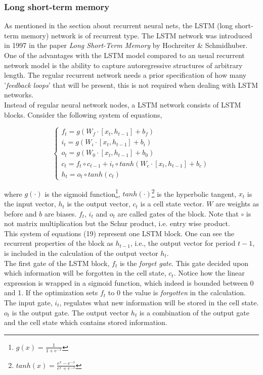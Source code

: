 \documentclass[12pt, letterpaper]{amsart}%
\begin{document}
\subsubsection{Long short-term memory}
As mentioned in the section about recurrent neural nets, the LSTM (long short-term memory) network is of recurrent type. The LSTM network was introduced in 1997 in the paper \textit{Long Short-Term Memory} by Hochreiter \& Schmidhuber. One of the advantages with the LSTM model compared to an usual recurrent network model is the ability to capture autoregressive structures of arbitrary length. The regular recurrent network needs a prior specification of how many '\textit{feedback loops}' that will be present, this is not required when dealing with LSTM networks.
\\

Instead of regular neural network nodes, a LSTM network consists of LSTM blocks. Consider the following system of equations,

\begin{equation}
\begin{cases}
f_t = g \left( W_f \cdot [x_t, h_{t-1}] + b_f \right)\\
i_t = g \left( W_i \cdot [x_t, h_{t-1}] + b_i \right)\\
o_t = g \left( W_0 \cdot [x_t, h_{t-1}] + b_0 \right)\\
c_t = f_t \circ c_{t-1} + i_t \circ tanh \left( W_c \cdot [x_t, h_{t-1}] + b_c \right)\\
h_t = o_t \circ tanh \left( c_t \right)
\end{cases}
\end{equation}

where $g(\cdot)$ is the sigmoid function\footnote{$g(x)=\frac{1}{1+e^{-x}}$}, $tanh(\cdot)$\footnote{$tanh(x)= \frac{e^x - e^{-x}}{e^x + e^{-x}}$} is the hyperbolic tangent, $x_t$ is the input vector, $h_t$ is the output vector, $c_t$ is a cell state vector. $W$ are weights as before and $b$ are biases. $f_t$, $i_t$ and $o_t$ are called gates of the block. Note that $\circ$ is not matrix multiplication but the Schur product, i.e. entry wise product.
\\

This system of equations (19) represent one LSTM block. One can see the recurrent properties of the block as $h_{t-1}$, i.e., the output vector for period $t-1$, is included in the calculation of the output vector $h_t$.
\\

The first gate of the LSTM block, $f_t$ is the \textit{forget gate}. This gate decided upon which information will be forgotten in the cell state, $c_t$. Notice how the linear expression is wrapped in a sigmoid function, which indeed is bounded between 0 and 1. If the optimization sets $f_t$ to 0 the value is \textit{forgotten} in the calculation. The input gate, $i_t$, regulates what new information will be stored in the cell state. $o_t$ is the output gate. The output vector $h_t$ is a combination of the output gate and the cell state which contains stored information.
\\
\end{document}
